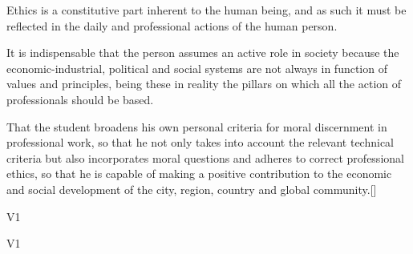 \begin{syllabus}


\begin{justification}
Ethics is a constitutive part inherent to the human being, 
and as such it must be reflected in the daily and professional 
actions of the human person. 

It is indispensable that the person assumes an active role in 
society because the economic-industrial, political and social 
systems are not always in function of values and principles, 
being these in reality the pillars on which all the action of 
professionals should be based.
\end{justification}

\begin{goals}
\item That the student broadens his own personal criteria for moral discernment in professional work, so that he not only takes into account the relevant technical criteria but also incorporates moral questions and adheres to correct professional ethics, so that he is capable of making a positive contribution to the economic and social development of the city, region, country and global community.[\Usage]
\end{goals}

\begin{outcomes}{V1}
    \item {}
	\item {}
\end{outcomes}

\begin{specificoutcomes}{V1} 
    \item {}
	\item {}
	\item {}
	\item {}
	\item {}
	\item {}
	\item {}
	\item {}
	\item {}
	\item {}
\end{specificoutcomes}


\end{syllabus}
